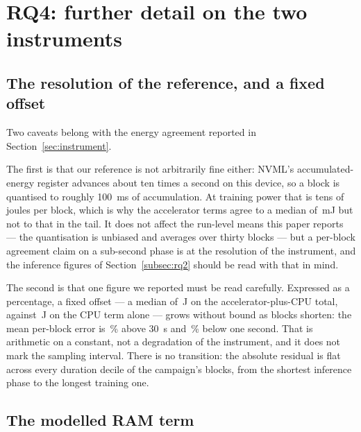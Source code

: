 \section{RQ4: further detail on the two instruments}
\label{app:rq4}

\subsection{The resolution of the reference, and a fixed offset}
\label{app:resolution}

Two caveats belong with the energy agreement reported in
Section~\ref{sec:instrument}.

The first is that our reference is not
arbitrarily fine either: NVML's accumulated-energy register advances about ten
times a second on this device, so a block is quantised to roughly
\SI{100}{\milli\second} of accumulation. At training power that is tens of
joules per block, which is why the accelerator terms agree to a median of
\vOffsetGpuMedianMJ\,\si{\milli\joule} but not to that in the tail. It does not
affect the run-level means this paper reports --- the quantisation is unbiased
and averages over thirty blocks --- but a per-block agreement claim on a
sub-second phase is at the resolution of the instrument, and the inference
figures of Section~\ref{subsec:rq2} should be read with that in mind.

The second is that one figure we reported must be read carefully. Expressed as a
percentage, a fixed offset --- a median of \vOffsetMedianJ\,\si{\joule} on
the accelerator-plus-CPU total, against \vOffsetCpuMedianJ\,\si{\joule} on the
CPU term alone --- grows without bound as
blocks shorten: the mean per-block error is \vAgreeLongPct\,\% above
\SI{30}{\second} and \vAgreeShortPct\,\% below one second. That is arithmetic on
a constant, not a degradation of the instrument, and it does not mark the
sampling interval. There is no transition: the absolute residual is
flat across every duration decile of the campaign's blocks, from the shortest
inference phase to the longest training one.

\subsection{The modelled RAM term}
\label{app:ram}

